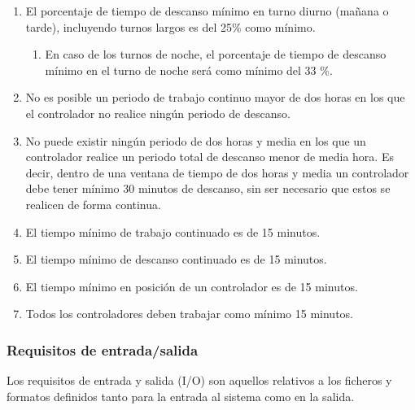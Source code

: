 \begin{enumerate}[resume*]
	
	\item \label{RD:porcentaje-min-descanso} El porcentaje de tiempo de descanso mínimo en turno diurno (mañana o tarde), incluyendo turnos largos es del 25\% como mínimo.
	\begin{enumerate}[label*={\textbf{.\arabic*}}]
		\item En caso de los turnos de noche, el porcentaje de tiempo de descanso mínimo en el turno de noche será
		como mínimo del 33 \%.
	\end{enumerate}
	
	\item No es posible un periodo de trabajo continuo mayor de dos horas en los que el controlador no realice ningún periodo de descanso.
	
	\item No puede existir ningún periodo de dos horas y media en los que un controlador realice un periodo total de descanso menor de media hora. Es decir, dentro de una ventana de tiempo de dos horas y media un controlador debe tener mínimo 30 minutos de descanso, sin ser necesario que estos se realicen de forma continua.
	
	\item El tiempo mínimo de trabajo continuado es de 15 minutos.
	
	\item El tiempo mínimo de descanso continuado es de 15 minutos.
	
	\item El tiempo mínimo en posición de un controlador es de 15 minutos.
	
	\item Todos los controladores deben trabajar como mínimo 15 minutos.
	
\end{enumerate}


\subsubsection{Requisitos de entrada/salida} \label{sec:4:req-io}
Los requisitos de entrada y salida (I/O) son aquellos relativos a los ficheros y formatos definidos tanto para la entrada al sistema como en la salida.

